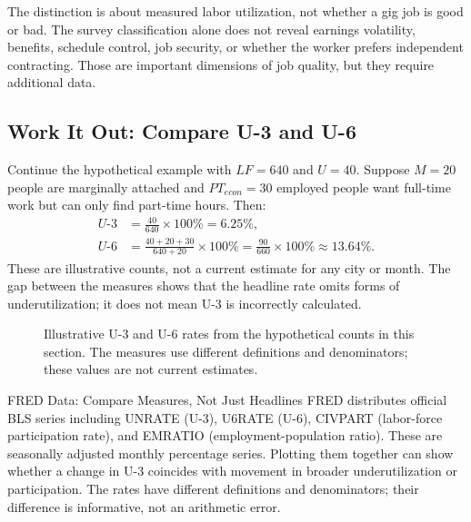 \documentclass[11pt,letterpaper]{article}
\begin{document}
The distinction is about measured labor utilization, not whether a gig job is good or bad. The survey classification alone does not reveal earnings volatility, benefits, schedule control, job security, or whether the worker prefers independent contracting. Those are important dimensions of job quality, but they require additional data.

\subsection{Work It Out: Compare U-3 and U-6}
Continue the hypothetical example with $LF=640$ and $U=40$. Suppose $M=20$ people are marginally attached and $PT_{econ}=30$ employed people want full-time work but can only find part-time hours. Then:
\begin{align}
U\text{-}3 &= \frac{40}{640}\times100\%=6.25\%,\\
U\text{-}6 &= \frac{40+20+30}{640+20}\times100\%
=\frac{90}{660}\times100\%\approx13.64\%.
\end{align}
These are illustrative counts, not a current estimate for any city or month. The gap between the measures shows that the headline rate omits forms of underutilization; it does not mean U-3 is incorrectly calculated.

\begin{figure}[htbp]
\centering
{}
\caption{Illustrative U-3 and U-6 rates from the hypothetical counts in this section. The measures use different definitions and denominators; these values are not current estimates.}
\label{fig:u3-u6-comparison}
\end{figure}

\begin{examplecase}{FRED Data: Compare Measures, Not Just Headlines}
FRED distributes official BLS series including UNRATE (U-3), U6RATE (U-6), CIVPART (labor-force participation rate), and EMRATIO (employment-population ratio). These are seasonally adjusted monthly percentage series. Plotting them together can show whether a change in U-3 coincides with movement in broader underutilization or participation. The rates have different definitions and denominators; their difference is informative, not an arithmetic error.
\end{examplecase}
\end{document}

